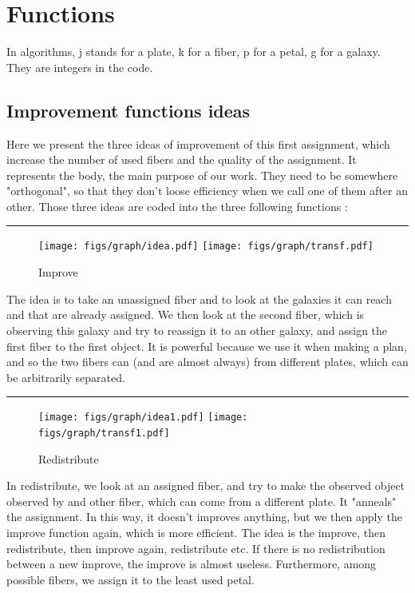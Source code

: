 \documentclass{article}
\begin{document}
\section{Functions}
In algorithms, j stands for a plate, k for a fiber, p for a petal, g for a galaxy. They are integers in the code.

\subsection{Improvement functions ideas}
Here we present the three ideas of improvement of this first assignment, which increase the number of used fibers and the quality of the assignment. It represents the body, the main purpose of our work. They need to be somewhere "orthogonal", so that they don't loose efficiency when we call one of them after an other.
Those three ideas are coded into the three following functions :

\begin{center}\rule{8cm}{0.4pt}\end{center}

\begin{figure}[H]
	\hspace*{5cm}
	\texttt{[image: figs/graph/idea.pdf]}
	\hspace*{1cm}
	\texttt{[image: figs/graph/transf.pdf]}\hfill
	\caption{Improve}\label{transf}
\end{figure}

The idea is to take an unassigned fiber and to look at the galaxies it can reach and that are already assigned. We then look at the second fiber, which is observing this galaxy and try to reassign it to an other galaxy, and assign the first fiber to the first object. It is powerful because we use it when making a plan, and so the two fibers can (and are almost always) from different plates, which can be arbitrarily separated.

\begin{center}\rule{8cm}{0.4pt}\end{center}

\begin{figure}[H]
	\hspace*{5cm}
	\texttt{[image: figs/graph/idea1.pdf]}
	\hspace*{1cm}
	\texttt{[image: figs/graph/transf1.pdf]}\hfill
	\caption{Redistribute}\label{transf1}
\end{figure}

In redistribute, we look at an assigned fiber, and try to make the observed object observed by and other fiber, which can come from a different plate. It "anneals" the assignment. In this way, it doesn't improves anything, but we then apply the improve function again, which is more efficient. The idea is the improve, then redistribute, then improve again, redistribute etc. If there is no redistribution between a new improve, the improve is almost useless. Furthermore, among possible fibers, we assign it to the least used petal.
\end{document}
